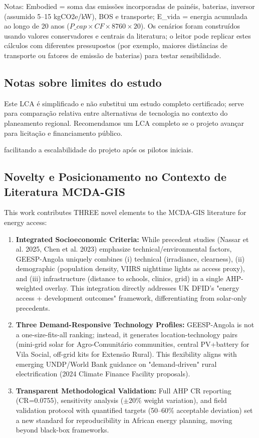 \documentclass[12pt, a4paper]{article}
\begin{document}
\noindent Notas: Embodied = soma das emissões incorporadas de painéis, baterias, inversor (assumido 5--15 kgCO2e/kW), BOS e transporte; E\_vida = energia acumulada ao longo de 20 anos ($P\_{cap}\times CF\times 8760\times 20$). Os cenários foram construídos usando valores conservadores e centrais da literatura; o leitor pode replicar estes cálculos com diferentes pressupostos (por exemplo, maiores distâncias de transporte ou fatores de emissão de baterias) para testar sensibilidade.

\subsection{Notas sobre limites do estudo}
Este LCA é simplificado e não substitui um estudo completo certificado; serve para
comparação relativa entre alternativas de tecnologia no contexto do planeamento regional.
Recomendamos um LCA completo se o projeto avançar para licitação e financiamento público.

facilitando a escalabilidade do projeto após os pilotos iniciais.

\subsection{Novelty e Posicionamento no Contexto de Literatura MCDA-GIS}

This work contributes THREE novel elements to the MCDA-GIS literature for energy access:

\begin{enumerate}
  \item \textbf{Integrated Socioeconomic Criteria:} While precedent studies (Nassar et al. 2025, Chen et al. 2023) emphasize technical/environmental factors, GEESP-Angola uniquely combines (i) technical (irradiance, clearness), (ii) demographic (population density, VIIRS nighttime lights as access proxy), and (iii) infrastructure (distance to schools, clinics, grid) in a single AHP-weighted overlay. This integration directly addresses UK DFID's "energy access + development outcomes" framework, differentiating from solar-only precedents.
  \item \textbf{Three Demand-Responsive Technology Profiles:} GEESP-Angola is not a one-size-fits-all ranking; instead, it generates location-technology pairs (mini-grid solar for Agro-Comunitário communities, central PV+battery for Vila Social, off-grid kits for Extensão Rural). This flexibility aligns with emerging UNDP/World Bank guidance on "demand-driven" rural electrification (2024 Climate Finance Facility proposals).
  \item \textbf{Transparent Methodological Validation:} Full AHP CR reporting (CR=0.0755), sensitivity analysis ($\pm 20\%$ weight variation), and field validation protocol with quantified targets (50--60\% acceptable deviation) set a new standard for reproducibility in African energy planning, moving beyond black-box frameworks.
\end{enumerate}
\end{document}
